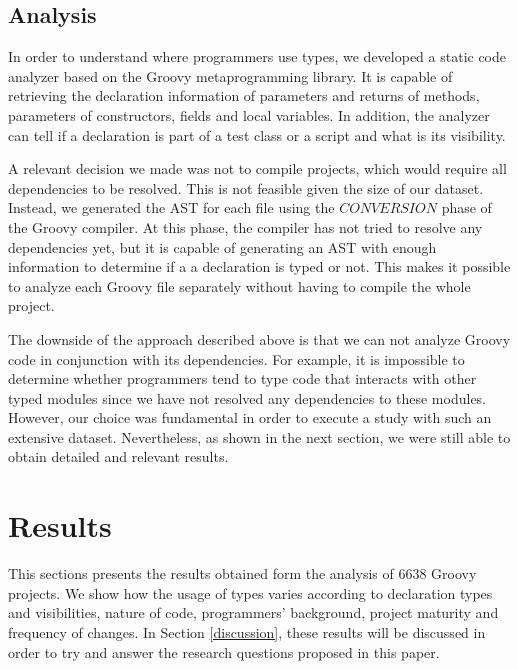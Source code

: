 \documentclass[preprint]{sigplanconf}
\begin{document}



\subsection{Analysis\label{analyzer}}
In order to understand where programmers use types, we developed a static code analyzer based on the Groovy metaprogramming library.
It is capable of retrieving the declaration information of parameters and returns of methods, parameters of constructors, fields and local variables.
In addition, the analyzer can tell if a declaration is part of a test class or a script and what is its visibility.

A relevant decision we made was not to compile projects, which would require all dependencies to be resolved.
This is not feasible given the size of our dataset.
Instead, we generated the AST for each file using the $CONVERSION$ phase of the Groovy compiler.
At this phase, the compiler has not tried to resolve any dependencies yet, but it is capable of generating an AST with enough information to determine if a a declaration is typed or not.
This makes it possible to analyze each Groovy file separately without having to compile the whole project.

The downside of the approach described above is that we can not analyze Groovy code in conjunction with its dependencies. 
For example, it is impossible to determine whether programmers tend to type code that interacts with other typed modules since we have not resolved any dependencies to these modules.
However, our choice was fundamental in order to execute a study with such an extensive dataset.
Nevertheless, as shown in the next section, we were still able to obtain detailed and relevant results.











%
%
\section{Results\label{results}}
This sections presents the results obtained form the analysis of 6638 Groovy projects.
We show how the usage of types varies according to declaration types and visibilities, nature of code, programmers' background, project maturity and frequency of changes.
In Section \ref{discussion}, these results will be discussed in order to try and answer the research questions proposed in this paper.
\end{document}
